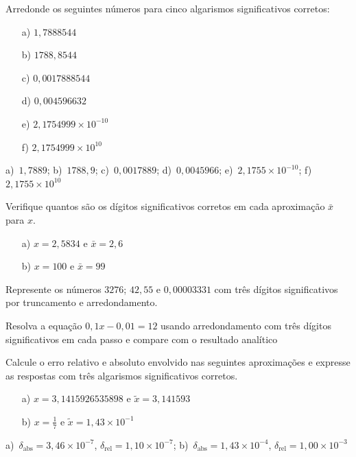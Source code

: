 \begin{Exercise} Arredonde os seguintes números para cinco algarismos significativos corretos:
  \begin{multicols}{3}
    \begin{itemize}
    \item [a)] $1,7888544$
    \item [b)] $1788,8544$
    \item [c)] $0,0017888544$
    \item [d)] $0,004596632$
    \item [e)] $ 2,1754999\times 10^{-10}$
    \item [f)] $ 2,1754999\times 10^{10}$
    \end{itemize}
  \end{multicols}
\end{Exercise}
\begin{Answer}
  \begin{tiny}
a)~$1,7889$; b)~$1788,9$; c)~$0,0017889$; d)~$0,0045966$; e)~$2,1755\times 10^{-10}$; f)~$2,1755\times 10^{10}$    
  \end{tiny}
\end{Answer}

\begin{Exercise}
Verifique quantos são os dígitos significativos corretos em cada aproximação $\bar{x}$ para $x$.
\begin{itemize}
\item[a)] $x=2,5834$ e $\bar{x}=2,6$
\item[b)] $x=100$ e $\bar{x}=99$
\end{itemize}
\end{Exercise}

\begin{Exercise}  Represente os números $3276$; $42,55$ e $0,00003331$ com três dígitos significativos por truncamento e arredondamento.
\end{Exercise}

\begin{Exercise} Resolva a equação $0,1x-0,01=12$ usando arredondamento com três dígitos significativos em cada passo e compare com o resultado analítico
\end{Exercise}


\begin{Exercise} Calcule o erro relativo e absoluto envolvido nas seguintes aproximações e expresse as respostas com três algarismos significativos corretos.
    \begin{itemize}
    \item [a)] $x=3,1415926535898$ e $\tilde{x}=3,141593$
    \item [b)] $x=\frac{1}{7}$ e $\tilde{x}=1,43\times 10^{-1}$
    \end{itemize}
\end{Exercise}
\begin{Answer}
  \begin{tiny}
    a)~$\delta_{\mbox{abs}}=3,46\times 10^{-7}$, $\delta_{\mbox{rel}}=1,10\times 10^{-7}$; b)~$\delta_{\mbox{abs}}=1,43\times 10^{-4}$, $\delta_{\mbox{rel}} = 1,00 \times 10^{-3}$
  \end{tiny}
\end{Answer}

